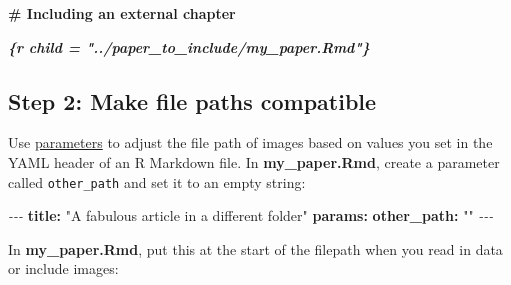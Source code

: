 \documentclass[a4paper, nobind]{templates/ociamthesis}
\newenvironment{Shaded}{\begin{snugshade}}{\end{snugshade}}
\newcommand{\AttributeTok}[1]{\textcolor[rgb]{0.13,0.29,0.53}{#1}}
\newcommand{\FunctionTok}[1]{\textcolor[rgb]{0.13,0.29,0.53}{\textbf{#1}}}
\newcommand{\InformationTok}[1]{\textcolor[rgb]{0.56,0.35,0.01}{\textbf{\textit{#1}}}}
\newcommand{\KeywordTok}[1]{\textcolor[rgb]{0.13,0.29,0.53}{\textbf{#1}}}
\newcommand{\NormalTok}[1]{#1}
\newcommand{\OtherTok}[1]{\textcolor[rgb]{0.56,0.35,0.01}{#1}}
\newcommand{\PreprocessorTok}[1]{\textcolor[rgb]{0.56,0.35,0.01}{\textit{#1}}}
\newcommand{\SpecialCharTok}[1]{\textcolor[rgb]{0.81,0.36,0.00}{\textbf{#1}}}
\newcommand{\StringTok}[1]{\textcolor[rgb]{0.31,0.60,0.02}{#1}}
\renewenvironment{Shaded}
{
  \vspace{10pt}%
  \begin{snugshade}%
}{%
  \end{snugshade}%
  \vspace{8pt}%
}
\begin{document}
\begin{Shaded}
\begin{Highlighting}[]
\FunctionTok{\# Including an external chapter }

\InformationTok{\textasciigrave{}\textasciigrave{}\textasciigrave{}\{r child = "../paper\_to\_include/my\_paper.Rmd"\}}
\InformationTok{\textasciigrave{}\textasciigrave{}\textasciigrave{}}
\end{Highlighting}
\end{Shaded}

\subsection{Step 2: Make file paths compatible}\label{step-2-make-file-paths-compatible}

Use \href{https://rmarkdown.rstudio.com/lesson-6.html}{parameters} to adjust the file path of images based on values you set in the YAML header of an R Markdown file.
In \textbf{my\_paper.Rmd}, create a parameter called \texttt{other\_path} and set it to an empty string:

\begin{Shaded}
\begin{Highlighting}[]
\PreprocessorTok{{-}{-}{-}}
\FunctionTok{title}\KeywordTok{:}\AttributeTok{ }\StringTok{"A fabulous article in a different folder"}
\FunctionTok{params}\KeywordTok{:}
\AttributeTok{  }\FunctionTok{other\_path}\KeywordTok{:}\AttributeTok{ }\StringTok{""}
\PreprocessorTok{{-}{-}{-}}
\end{Highlighting}
\end{Shaded}

In \textbf{my\_paper.Rmd}, put this at the start of the filepath when you read in data or include images:

\begin{Shaded}
\end{Shaded}
\end{document}
